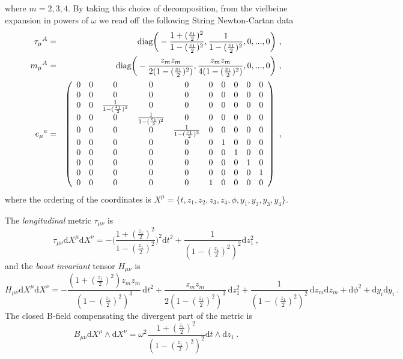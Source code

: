 \documentclass[12pt]{article}
\def\dd{\text{d}}
\numberwithin{equation}{section}
\begin{document}
\begin{appendices}
\begin{equation}
\end{equation}
where $m = 2, 3,4$. 
By taking this choice of decomposition,  from the vielbeine expansion in powers of $\omega$ we read off the following String Newton-Cartan data 
\begin{eqnarray}
\notag
\tau_{\mu}{}^A &=& \text{diag}\bigg(-\frac{1+ (\frac{z_1}{2})^2}{1- (\frac{z_1}{2})^2},   \frac{1}{1 - (\frac{z_1}{2})^2}, 0, ... , 0 \bigg) \ , \\
m_{\mu}{}^A &=& \text{diag}\bigg(-\frac{z_m z_m}{2(1-(\frac{z_1}{2})^2)},  \frac{z_m z_m}{4(1-(\frac{z_1}{2})^2)}, 0, ... , 0 \bigg) \ , \\
\notag
e_{\mu}{}^a &=& \left(
\begin{array}{cccccccccc}
 0 & 0 & 0 & 0 & 0 & 0 & 0 & 0 & 0 & 0 \\
 0 & 0 & 0 & 0 & 0 & 0 & 0 & 0 & 0 & 0 \\
 0 & 0 & \frac{1}{1 - (\frac{z_1}{2})^2} & 0 & 0 & 0
   & 0 & 0 & 0 & 0 \\
 0 & 0 & 0 & \frac{1}{1 - (\frac{z_1}{2})^2} & 0 & 0
   & 0 & 0 & 0 & 0 \\
 0 & 0 & 0 & 0 & \frac{1}{1 - (\frac{z_1}{2})^2} & 0
   & 0 & 0 & 0 & 0 \\
 0 & 0 & 0 & 0 & 0 & 0 & 1 & 0 & 0 & 0 \\
 0 & 0 & 0 & 0 & 0 & 0 & 0 & 1 & 0 & 0 \\
 0 & 0 & 0 & 0 & 0 & 0 & 0 & 0 & 1 & 0 \\
 0 & 0 & 0 & 0 & 0 & 0 & 0 & 0 & 0 & 1 \\
 0 & 0 & 0 & 0 & 0 & 1 & 0 & 0 & 0 & 0 \\
\end{array}
\right) \ ,
\end{eqnarray}
where the ordering of the coordinates is $X^{\mu} =\{t,  z_1, z_2, z_3, z_4, \phi, y_1, y_2, y_3, y_4\}$. 

The \emph{longitudinal} metric $\tau_{\mu\nu}$ is
\begin{equation}
\tau_{\mu\nu} \dd X^{\mu} \dd X^{\nu} = - \bigg(\frac{1+ (\frac{z_1}{2})^2}{1- (\frac{z_1}{2})^2}\bigg)^2 \dd t^2 + \frac{1}{(1 - (\frac{z_1}{2})^2)^2} \dd z_1^2 \ ,
\end{equation}
and the \emph{boost invariant} tensor $H_{\mu\nu}$ is 
\begin{equation}
H_{\mu\nu} \dd X^{\mu} \dd X^{\nu} = - \frac{(1+ (\frac{z_1}{2})^2)z_m z_m}{(1- (\frac{z_1}{2})^2)^3} \, \dd t^2 
+ \frac{z_m z_m}{2(1- (\frac{z_1}{2})^2)^3}\,  \dd z_1^2 
+ \frac{1}{(1- (\frac{z_1}{2})^2)^2} \, \dd z_m \dd z_m + \dd \phi^2
+ \dd y_i \dd y_i \ .
\end{equation}
The closed B-field compensating the divergent part of the metric is 
\begin{equation}
B_{\mu\nu} \dd X^{\mu} \wedge \dd X^{\nu} = \omega^2 \frac{1+ (\frac{z_1}{2})^2}{(1 - (\frac{z_1}{2})^2)^2}  \dd t \wedge \dd z_1 \ . 
\end{equation}




\end{appendices}
\end{document}
